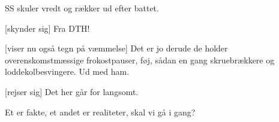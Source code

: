 \documentclass[a4paper,11pt]{article}
\begin{document}
\begin{sketch}
{    SS skuler vredt og rækker ud efter battet.}

  [skynder sig] Fra DTH!

  [viser nu også tegn på væmmelse] Det er jo derude de holder
  overenskomstmæssige frokostpauser, føj, sådan en gang skruebrækkere
  og loddekolbesvingere.  Ud med ham.

  [rejser sig] Det her går for langsomt.


 Et er fakte, et andet er realiteter, skal vi gå i gang?

\end{sketch}
\end{document}
